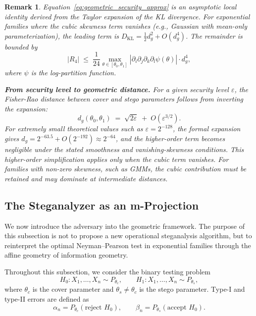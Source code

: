 \documentclass[a4paper,fleqn]{cas-dc}
\newtheorem{remark}{Remark}
\newcommand{\DKL}{D_{\mathrm{KL}}}
\begin{document}
\begin{remark}%
  Equation~\eqref{eq:geometric_security_approx} is an \emph{asymptotic
  local identity} derived from the Taylor expansion of the KL divergence.
  For exponential families where the cubic skewness term vanishes
  (e.g., Gaussian with mean-only parameterization), the leading term is
  $\DKL = \frac{1}{2}d_g^2 + O(d_g^4)$.  The remainder is bounded by
  \[
    |R_4| \;\leq\;
    \frac{1}{24} \max_{\theta\in[\theta_0,\theta_1]}
    |\partial_i\partial_j\partial_k\partial_l \psi(\theta)| \cdot d_g^4,
  \]
  where $\psi$ is the log-partition function.

  \textbf{From security level to geometric distance.}
  For a given security level $\varepsilon$, the Fisher-Rao distance
  between cover and stego parameters follows from inverting the
  expansion:
  \[
    d_g(\theta_0, \theta_1)
    \;=\; \sqrt{2\varepsilon} \;+\; O(\varepsilon^{3/2}).
  \]
For extremely small theoretical values such as
$\varepsilon = 2^{-128}$, the formal expansion gives
$d_g = 2^{-63.5} + O(2^{-192}) \approx 2^{-64}$, and the higher-order
term becomes negligible under the stated smoothness and vanishing-skewness
conditions.  This higher-order simplification applies only when the cubic term vanishes. For families with non-zero skewness, such as GMMs, the cubic contribution must be retained and may dominate at intermediate distances.
\end{remark}

\subsection{The Steganalyzer as an m-Projection}
\label{sec:detection_duality}

We now introduce the adversary into the geometric framework.
The purpose of this subsection is not to propose a new operational
steganalysis algorithm, but to reinterpret the optimal Neyman--Pearson
test in exponential families through the affine geometry of information
geometry.

Throughout this subsection, we consider the binary testing problem
\[
H_0 : X_1,\ldots,X_n \sim P_{\theta_c},
\qquad
H_1 : X_1,\ldots,X_n \sim P_{\theta_s},
\]
where $\theta_c$ is the cover parameter and $\theta_s\neq\theta_c$ is the
stego parameter.  Type-I and type-II errors are defined as
\[
\alpha_n = P_{\theta_c}(\text{reject }H_0),
\qquad
\beta_n = P_{\theta_s}(\text{accept }H_0).
\]
\end{document}
